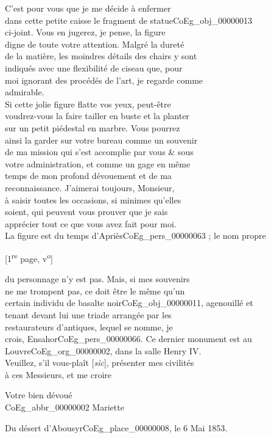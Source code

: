 \documentclass{book}
\begin{document}
C’est pour vous que je me décide à enfermer\\
dans cette petite caisse le fragment de statue\gls{CoEg_obj_00000013}\\
ci-joint. Vous en jugerez, je pense, la figure\\
digne de toute votre attention. Malgré la dureté\\
de la matière, les moindres détails des chairs y sont\\
indiqués avec une flexibilité de ciseau que, pour\\
moi ignorant des procédés de l’art, je regarde comme\\
admirable.\\
\indent Si cette jolie figure flatte vos yeux, peut-être\\
voudrez-vous la faire tailler en buste et la planter\\
sur un petit piédestal en marbre. Vous pourrez\\
ainsi la garder sur votre bureau comme un souvenir\\
de ma mission qui s’est accomplie par vous \& sous\\
votre administration, et comme un gage en même\\
temps de mon profond dévouement et de ma\\
reconnaissance. J’aimerai toujours, Monsieur,\\
à saisir toutes les occasions, si minimes qu’elles\\
soient, qui peuvent vous prouver que je sais\\
apprécier tout ce que vous avez fait pour moi.\\
\indent La figure est du temps d’Apriès\gls{CoEg_pers_00000063} ; le nom propre
{\footnotesize \begin{center} {[1\textsuperscript{re} page, v\textsuperscript{o}]}\end{center}}
\noindent du personnage n’y est pas. Mais, si mes souvenirs\\
ne me trompent pas, ce doit être le même qu’un\\
certain individu de basalte noir\gls{CoEg_obj_00000011}, agenouillé et\\
tenant devant lui une triade arrangée par les\\
restaurateurs d’antiques, lequel se nomme, je\\
crois, Ensahor\gls{CoEg_pers_00000066}. Ce dernier monument est au\\
Louvre\gls{CoEg_org_00000002}, dans la salle Henry IV.\\
\indent Veuillez, s’il vous-plaît {[\textit{sic}]}, présenter mes civilités\\
à ces Messieurs, et me croire
\begin{center}\hspace{5cm} Votre bien dévoué\\
\hspace{5cm} \gls{CoEg_abbr_00000002} Mariette\end{center}
\indent Du désert d’Abousyr\gls{CoEg_place_00000008}, le 6 Mai 1853.
\end{document}

